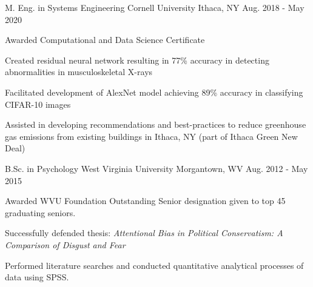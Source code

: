


\begin{cventries}


\cventry
{M. Eng. in Systems Engineering} %
{Cornell University} %
{Ithaca, NY} %
{Aug. 2018 -  May 2020} %
{ %
\begin{cvitems}
\item {Awarded Computational and Data Science Certificate}
\item {Created residual neural network  resulting in 77\% accuracy in detecting abnormalities in musculoskeletal X-rays}
\item {Facilitated development of AlexNet model achieving 89\% accuracy in classifying CIFAR-10 images} 
\item {Assisted in developing recommendations and best-practices to reduce greenhouse gas emissions from existing buildings in Ithaca, NY (part of Ithaca Green New Deal)}
\end{cvitems}
}

\cventry
{B.Sc. in Psychology} %
{West Virginia University} %
{Morgantown, WV} %
{Aug. 2012 -  May 2015} %
{ %
	\begin{cvitems}
		\item {Awarded WVU Foundation Outstanding Senior designation given to top 45 graduating seniors.}
		\item {Successfully defended thesis: \textit{Attentional Bias in Political Conservatism: A Comparison of Disgust and Fear}}
		\item {Performed literature searches and conducted quantitative analytical processes of data using SPSS.}
	\end{cvitems}
}


\end{cventries}